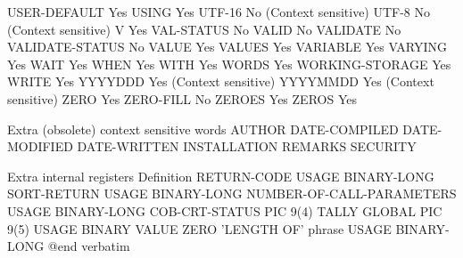 USER-DEFAULT                    Yes
USING                           Yes
UTF-16                          No (Context sensitive)
UTF-8                           No (Context sensitive)
V                               Yes
VAL-STATUS                      No
VALID                           No
VALIDATE                        No
VALIDATE-STATUS                 No
VALUE                           Yes
VALUES                          Yes
VARIABLE                        Yes
VARYING                         Yes
WAIT                            Yes
WHEN                            Yes
WITH                            Yes
WORDS                           Yes
WORKING-STORAGE                 Yes
WRITE                           Yes
YYYYDDD                         Yes (Context sensitive)
YYYYMMDD                        Yes (Context sensitive)
ZERO                            Yes
ZERO-FILL                       No
ZEROES                          Yes
ZEROS                           Yes

Extra (obsolete) context sensitive words
AUTHOR
DATE-COMPILED
DATE-MODIFIED
DATE-WRITTEN
INSTALLATION
REMARKS
SECURITY

Extra internal registers        Definition
RETURN-CODE                     USAGE BINARY-LONG
SORT-RETURN                     USAGE BINARY-LONG
NUMBER-OF-CALL-PARAMETERS       USAGE BINARY-LONG
COB-CRT-STATUS                  PIC 9(4)
TALLY                           GLOBAL PIC 9(5) USAGE BINARY VALUE ZERO
'LENGTH OF' phrase              USAGE BINARY-LONG
@end verbatim

